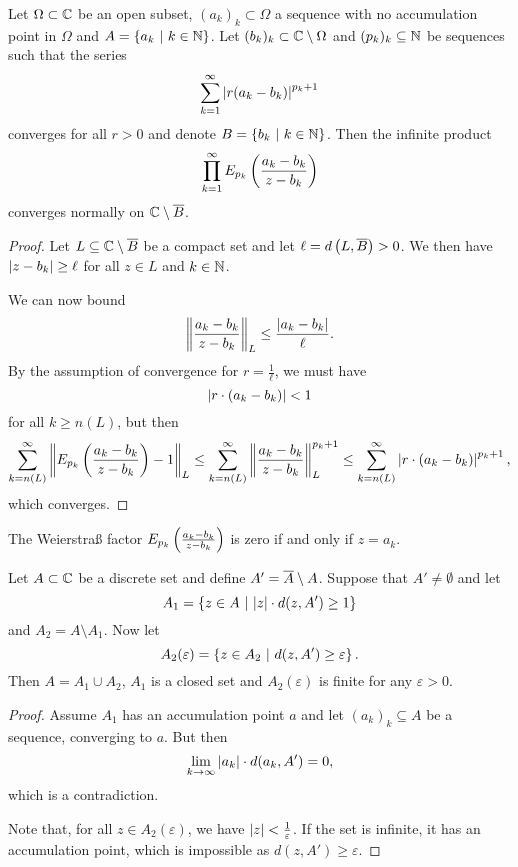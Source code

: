 \obvs

\begin{lema}
\label{inf_prod:lm:w_prod_omega}
Let $\Omega \subset \mathbb{C}$ be an open subset, $(a_k)_k \subset \Omega$
a sequence with no accumulation point in $\Omega$ and
$A = \left\{a_k~\middle\vert~k \in \mathbb{N}\right\}$. Let
$(b_k)_k \subset \mathbb{C} \setminus \Omega$ and $(p_k)_k \subseteq \mathbb{N}$ be
sequences such that the series
\[
\sum_{k=1}^\infty \left\lvert r (a_k - b_k)\right\rvert^{p_k+1}
\]
converges for all $r > 0$ and denote $B = \left\{b_k~\middle\vert~k \in \mathbb{N}\right\}$.
Then the infinite product
\[
\prod_{k=1}^\infty E_{p_k} \left(\frac{a_k - b_k}{z - b_k}\right)
\]
converges normally on $\mathbb{C} \setminus \overline{B}$.
\end{lema}

\begin{proof}
Let $L \subseteq \mathbb{C} \setminus \overline{B}$ be a compact set and let
$\ell = d\left(L, \overline{B}\right) > 0$. We then have
$\left\lvert z - b_k\right\rvert \geq \ell$ for all $z \in L$ and $k \in \mathbb{N}$.

We can now bound
\[
\left\lVert \frac{a_k - b_k}{z - b_k}\right\rVert_L \leq
\frac{\left\lvert a_k - b_k\right\rvert}{\ell}.
\]
By the assumption of convergence for $r = \frac{1}{\ell}$, we must
have
\[
\left\lvert r \cdot (a_k - b_k)\right\rvert < 1
\]
for all $k \geq n(L)$, but then
\[
\sum_{k=n(L)}^\infty
\left\lVert E_{p_k} \left(\frac{a_k - b_k}{z - b_k}\right) - 1\right\rVert_L \leq
\sum_{k=n(L)}^\infty 
\left\lVert \frac{a_k - b_k}{z - b_k}\right\rVert_L^{p_k+1}\leq
\sum_{k=n(L)}^\infty \left\lvert r \cdot \left(a_k - b_k\right)\right\rvert^{p_k+1},
\]
which converges.
\end{proof}

\begin{opomba}
The Weierstraß factor $E_{p_k} \left(\frac{a_k - b_k}{z - b_k}\right)$ is
zero if and only if $z = a_k$.
\end{opomba}

\begin{lema}
\label{inf_prod:lm:divideA}
Let $A \subset \mathbb{C}$ be a discrete set and define
$A' = \overline{A} \setminus A$. Suppose that $A' \ne \emptyset$ and
let
\[
A_1 = \left\{z \in A~\middle\vert~\left\lvert z\right\rvert \cdot d(z, A') \geq 1\right\}
\]
and $A_2 = A \setminus A_1$. Now let
\[
A_2(\varepsilon) = \left\{z \in A_2~\middle\vert~d(z, A') \geq \varepsilon\right\}.
\]
Then $A = A_1 \cup A_2$, $A_1$ is a closed set and
$A_2(\varepsilon)$ is finite for any $\varepsilon > 0$.
\end{lema}

\begin{proof}
Assume $A_1$ has an accumulation point $a$ and let
$(a_k)_k \subseteq A$ be a sequence, converging to $a$. But then
\[
\lim_{k \to \infty} \left\lvert a_k\right\rvert \cdot d(a_k, A') = 0,
\]
which is a contradiction.

Note that, for all $z \in A_2(\varepsilon)$, we have
$\left\lvert z\right\rvert < \frac{1}{\varepsilon}$. If the set is infinite, it has
an accumulation point, which is impossible as
$d(z, A') \geq \varepsilon$.
\end{proof}

